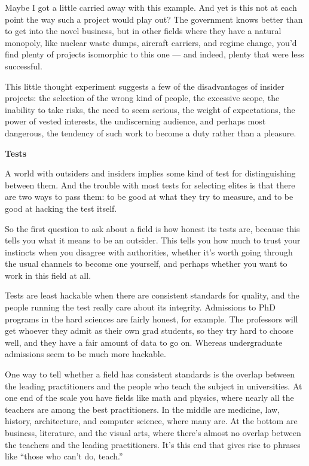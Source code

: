 Maybe I got a little carried away with this example. And yet is this not
at each point the way such a project would play out? The government
knows better than to get into the novel business, but in other fields
where they have a natural monopoly, like nuclear waste dumps, aircraft
carriers, and regime change, you'd find plenty of projects isomorphic to
this one --- and indeed, plenty that were less successful.

This little thought experiment suggests a few of the disadvantages of
insider projects: the selection of the wrong kind of people, the
excessive scope, the inability to take risks, the need to seem serious,
the weight of expectations, the power of vested interests, the
undiscerning audience, and perhaps most dangerous, the tendency of such
work to become a duty rather than a pleasure.

\textbf{Tests}

A world with outsiders and insiders implies some kind of test for
distinguishing between them. And the trouble with most tests for
selecting elites is that there are two ways to pass them: to be good at
what they try to measure, and to be good at hacking the test itself.

So the first question to ask about a field is how honest its tests are,
because this tells you what it means to be an outsider. This tells you
how much to trust your instincts when you disagree with authorities,
whether it's worth going through the usual channels to become one
yourself, and perhaps whether you want to work in this field at all.

Tests are least hackable when there are consistent standards for
quality, and the people running the test really care about its
integrity. Admissions to PhD programs in the hard sciences are fairly
honest, for example. The professors will get whoever they admit as their
own grad students, so they try hard to choose well, and they have a fair
amount of data to go on. Whereas undergraduate admissions seem to be
much more hackable.

One way to tell whether a field has consistent standards is the overlap
between the leading practitioners and the people who teach the subject
in universities. At one end of the scale you have fields like math and
physics, where nearly all the teachers are among the best practitioners.
In the middle are medicine, law, history, architecture, and computer
science, where many are. At the bottom are business, literature, and the
visual arts, where there's almost no overlap between the teachers and
the leading practitioners. It's this end that gives rise to phrases like
``those who can't do, teach.''

